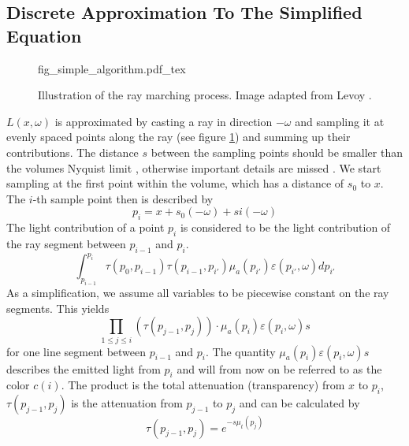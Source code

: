 \subsection{Discrete Approximation To The Simplified Equation}

\begin{figure}
\centering
\def\svgwidth{\columnwidth}
{fig_simple_algorithm.pdf_tex}

\caption{Illustration of the ray marching process. Image adapted from Levoy \cite{10.1145/78964.78965}.}
\label{fig:simple_algorithm}
\end{figure}



$L({x},\omega )$ is approximated by casting a ray in direction $-\omega$ and sampling it at evenly spaced points along the ray (see figure \ref{fig:simple_algorithm}) and summing up their contributions\cite{511}. The distance $s$ between the sampling points should be smaller than the volumes Nyquist limit \cite{659497}, otherwise important details are missed \cite{10.1145/2661229.2661292}.
We start sampling at the first point within the volume, which has a distance of $s_0$ to ${x}$. The $i$-th sample point then is described by
\begin{equation}
p_i={x} + s_0(-\omega) + si(-\omega)
\end{equation}
The light contribution of a point $p_i$ is considered to be the light contribution of the ray segment between $p_{i-1}$ and $p_i$.
\begin{equation}
\int_{p_{i-1}}^{p_i} \tau (p_0,p_{i-1}) \tau(p_{i-1},p_{i'}) \mu_a(p_{i'})\varepsilon (p_{i'}, \omega)dp_{i'}
\end{equation} 
As a simplification, we assume all variables to be piecewise constant\cite{10.1145/147130.147155} on the ray segments. This yields
\begin{equation}
{\prod_{1\le j \le i}{(\tau(p_{j-1}, p_j))} \cdot \mu_a(p_{i})\varepsilon (p_{i}, \omega)s}
\end{equation} 
for one line segment between $p_{i-1}$ and $p_i$.
The quantity $\mu_a(p_{i})\varepsilon (p_{i}, \omega)s$ describes the emitted light from $p_i$ and will from now on be referred to as the color $c(i)$. The product is the total attenuation (transparency) from ${x}$ to $p_i$, $\tau(p_{j-1}, p_j)$ is the attenuation from $p_{j-1}$ to $p_j$ and can be calculated by
\begin{equation}
\tau(p_{j-1}, p_j) = e^{-s\mu_t(p_j)}
\end{equation}

